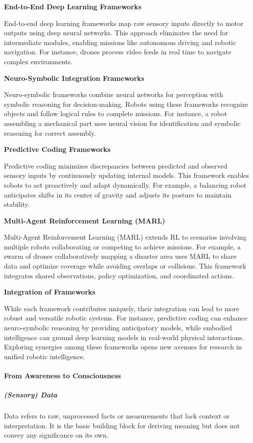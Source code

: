 \documentclass{book}
\providecommand{\ProjectDeepHeading}[2]{%
    \par\medskip\noindent\textbf{#2}\par\smallskip
}
\begin{document}
    \ProjectDeepHeading{5}{End-to-End Deep Learning Frameworks}
    End-to-end deep learning frameworks map raw sensory inputs directly to motor outputs using deep neural networks. This approach eliminates the need for intermediate modules, enabling missions like autonomous driving and robotic navigation. For instance, drones process video feeds in real time to navigate complex environments.

    \ProjectDeepHeading{5}{Neuro-Symbolic Integration Frameworks}
    Neuro-symbolic frameworks combine neural networks for perception with symbolic reasoning for decision-making. Robots using these frameworks recognize objects and follow logical rules to complete missions. For instance, a robot assembling a mechanical part uses neural vision for identification and symbolic reasoning for correct assembly.

    \ProjectDeepHeading{5}{Predictive Coding Frameworks}
    Predictive coding minimizes discrepancies between predicted and observed sensory inputs by continuously updating internal models. This framework enables robots to act proactively and adapt dynamically. For example, a balancing robot anticipates shifts in its center of gravity and adjusts its posture to maintain stability. 

    \ProjectDeepHeading{5}{Multi-Agent Reinforcement Learning (MARL)}
    Multi-Agent Reinforcement Learning (MARL) extends RL to scenarios involving multiple robots collaborating or competing to achieve missions. For example, a swarm of drones collaboratively mapping a disaster area uses MARL to share data and optimize coverage while avoiding overlaps or collisions. This framework integrates shared observations, policy optimization, and coordinated actions.

    \ProjectDeepHeading{5}{Integration of Frameworks}
    While each framework contributes uniquely, their integration can lead to more robust and versatile robotic systems. For instance, predictive coding can enhance neuro-symbolic reasoning by providing anticipatory models, while embodied intelligence can ground deep learning models in real-world physical interactions. Exploring synergies among these frameworks opens new avenues for research in unified robotic intelligence.


\paragraph{From Awareness to Consciousness}
\subparagraph{(Sensory) Data} Data refers to raw, unprocessed facts or measurements that lack context or interpretation. It is the basic building block for deriving meaning but does not convey any significance on its own.
\end{document}
